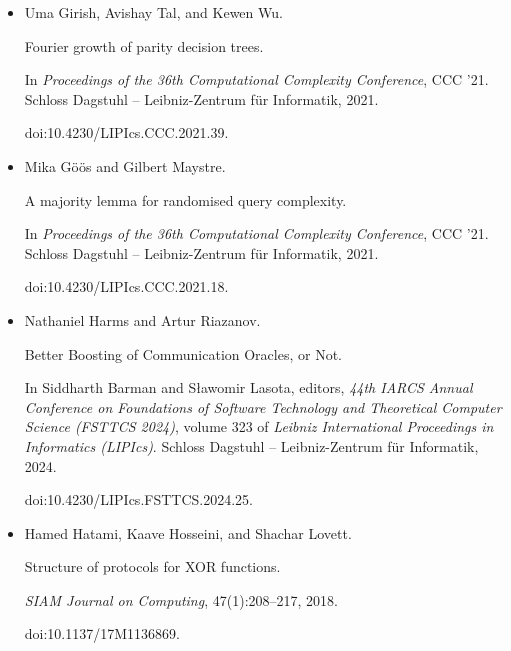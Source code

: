 \begin{itemize}
doi:10.1109/FOCS57990.2023.00047.





\item[] 
[28]

Uma Girish, Avishay Tal, and Kewen Wu.


Fourier growth of parity decision trees.


In \emph{Proceedings of the 36th Computational Complexity Conference},
CCC ’21. Schloss Dagstuhl – Leibniz-Zentrum für Informatik, 2021.


doi:10.4230/LIPIcs.CCC.2021.39.





\item[] 
[29]

Mika Göös and Gilbert Maystre.


A majority lemma for randomised query complexity.


In \emph{Proceedings of the 36th Computational Complexity Conference},
CCC ’21. Schloss Dagstuhl – Leibniz-Zentrum für Informatik, 2021.


doi:10.4230/LIPIcs.CCC.2021.18.





\item[] 
[30]

Nathaniel Harms and Artur Riazanov.


Better Boosting of Communication Oracles, or Not.


In Siddharth Barman and Sławomir Lasota, editors, \emph{44th IARCS
Annual Conference on Foundations of Software Technology and Theoretical
Computer Science (FSTTCS 2024)}, volume 323 of \emph{Leibniz International
Proceedings in Informatics (LIPIcs)}. Schloss Dagstuhl – Leibniz-Zentrum
für Informatik, 2024.


doi:10.4230/LIPIcs.FSTTCS.2024.25.





\item[] 
[31]

Hamed Hatami, Kaave Hosseini, and Shachar Lovett.


Structure of protocols for XOR functions.


\emph{SIAM Journal on Computing}, 47(1):208–217, 2018.


doi:10.1137/17M1136869.






\end{itemize}
